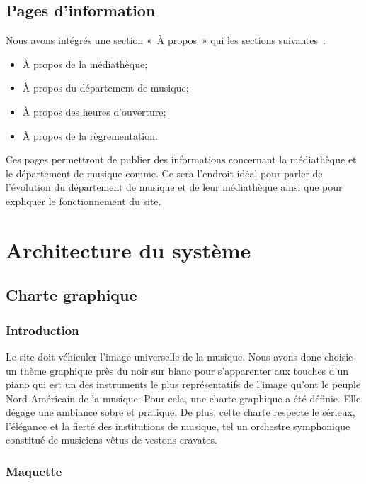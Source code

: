 \documentclass[letter, 11pt]{report}
\begin{document}
\section{Pages d'information}

Nous avons intégrés une section «~À propos~» qui les sections suivantes~:
\begin{itemize}
	\item À propos de la médiathèque;
	\item À propos du département de musique;
	\item À propos des heures d'ouverture;
	\item À propos de la règrementation.
\end{itemize}

Ces pages permettront de publier des informations concernant la médiathèque et le département de musique comme. Ce sera l'endroit idéal pour parler de l'évolution du département de musique et de leur médiathèque ainsi que pour expliquer le fonctionnement du site.

\chapter{Architecture du système}

\section{Charte graphique}

\subsection{Introduction}

Le site doit véhiculer l'image universelle de la musique. Nous avons donc choisie un thème graphique près du noir sur blanc pour s'apparenter aux touches d'un piano qui est un des instruments le plus représentatifs de l'image qu'ont le peuple Nord-Américain de la musique. Pour cela, une charte graphique a été définie. Elle dégage une ambiance sobre et pratique. De plus, cette charte respecte le sérieux, l'élégance et la fierté des institutions de musique, tel un orchestre symphonique constitué de musiciens vêtus de vestons cravates.

\subsection{Maquette}
\end{document}
